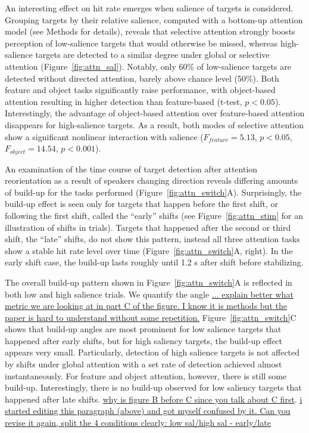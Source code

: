 \documentclass[9pt,twocolumn,twoside]{pnas-new}
\begin{document}
An interesting effect on hit rate emerges when salience of targets is considered. Grouping targets by their relative salience, computed with a bottom-up attention model \cite{Kaya14a} (see Methods for details), reveals that selective attention strongly boosts perception of low-salience targets that would otherwise be missed, whereas high-salience targets are detected to a similar degree under global or selective attention (Figure~\ref{fig:attn_sal}). Notably, only 60\% of low-salience targets are detected without directed attention, barely above chance level (50\%). Both feature and object tasks significantly raise performance, with object-based attention resulting in higher detection than feature-based (t-test, $p<0.05$). Interestingly, the advantage of object-based attention over feature-based attention disappears for high-salience targets. As a result, both modes of selective attention show a significant nonlinear interaction with salience ($F_{feature}= 5.13$, $p<0.05$, $F_{object} = 14.54$, $p<0.001$).

An examination of the time course of target detection after attention reorientation as a result of speakers changing direction reveals differing amounts of build-up for the tasks performed (Figure~\ref{fig:attn_switch}A). Surprisingly, the build-up effect is seen only for targets that happen before the first shift, or following the first shift, called the ``early'' shifts (see Figure~\ref{fig:attn_stim} for an illustration of shifts in trials). Targets that happened after the second or third shift, the ``late'' shifts, do not show this pattern, instead all three attention tasks show a stable hit rate level over time (Figure~\ref{fig:attn_switch}A, right). In the early shift case, the build-up lasts roughly until 1.2 s after shift before stabilizing.

The overall build-up pattern shown in Figure~\ref{fig:attn_switch}A is reflected in both low and high salience trials. We quantify the angle \underline{... explain better what metric we are looking at in part C of the figure. I know it is methods but the paper is hard to understand without some repetition.} Figure~\ref{fig:attn_switch}C shows that build-up angles are most prominent for low salience targets that happened after early shifts, but for high saliency targets, the build-up effect appears very small. Particularly, detection of high salience targets is not affected by shifts under global attention with a set rate of detection achieved almost instantaneously. For feature and object attention, however, there is still some build-up. Interestingly, there is no build-up observed for low saliency targets that happened after late shifts. \underline{why is figure B before C since you talk about C first}. \underline{i started editing this paragraph (above) and got myself confused by it. Can you revise it again, split the 4 conditions clearly: low sal/high sal - early/late}
\end{document}
